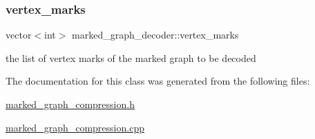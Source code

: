 \subsubsection{\texorpdfstring{vertex\+\_\+marks}{vertex\_marks}}
{\footnotesize\ttfamily vector$<$int$>$ marked\+\_\+graph\+\_\+decoder\+::vertex\+\_\+marks\hspace{0.3cm}{\ttfamily [private]}}



the list of vertex marks of the marked graph to be decoded 



The documentation for this class was generated from the following files\+:\begin{DoxyCompactItemize}
\item 
\hyperlink{marked__graph__compression_8h}{marked\+\_\+graph\+\_\+compression.\+h}\item 
\hyperlink{marked__graph__compression_8cpp}{marked\+\_\+graph\+\_\+compression.\+cpp}\end{DoxyCompactItemize}
